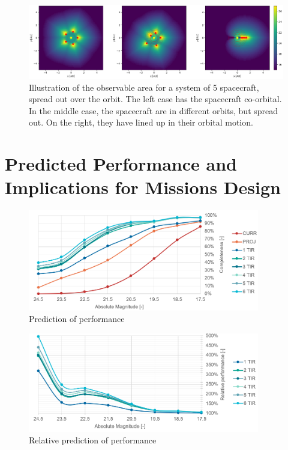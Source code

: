 \begin{figure}[htbp]
 \centering
 \includegraphics[width=1.0\textwidth]{img/coverage_free.png}
 \caption{Illustration of the observable area for a system of 5 spacecraft, spread out over the orbit. The left case has the spacecraft co-orbital. In the middle case, the spacecraft are in different orbits, but spread out. On the right, they have lined up in their orbital motion.}
 \label{fig:coverage_free}
\end{figure}




\section{Predicted Performance and Implications for Missions Design}
\label{sec:results_performance}



\begin{figure}[htbp]
 \centering
 \includegraphics[width=0.9\textwidth]{img/performance_prediction.png}
 \caption{Prediction of performance}
 \label{fig:performance_prediction}
\end{figure}

\begin{figure}[htbp]
 \centering
 \includegraphics[width=0.9\textwidth]{img/performance_prediction_rel.png}
 \caption{Relative prediction of performance}
 \label{fig:performance_prediction_rel}
\end{figure}


